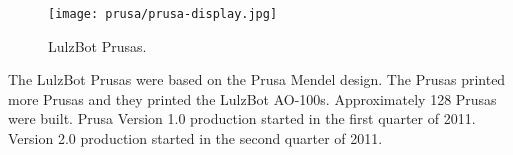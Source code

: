 %
%
%
%
%

\begin{figure}[h!]
\texttt{[image: prusa/prusa-display.jpg]}
 \caption{LulzBot Prusas.}
 \label{fig:prusa-display}
\end{figure}

The LulzBot Prusas were based on the Prusa Mendel design. The Prusas
printed more Prusas and they printed the LulzBot AO-100s. Approximately
128 Prusas were built. Prusa Version 1.0 production started in the first
quarter of 2011. Version 2.0 production started in the second quarter of 2011.




